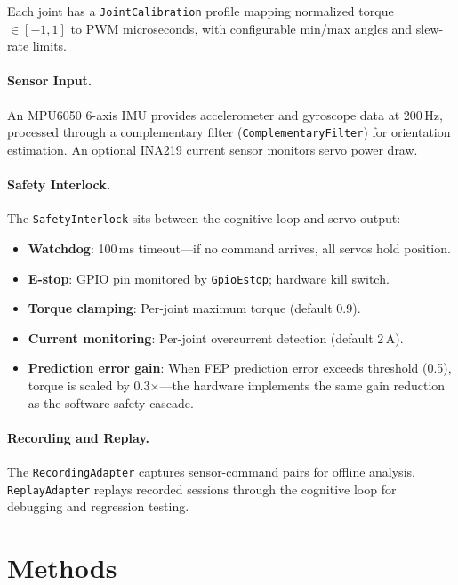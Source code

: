 \documentclass[11pt,twocolumn]{article}
\begin{document}
Each joint has a \texttt{JointCalibration} profile mapping normalized torque $\in [-1, 1]$ to PWM microseconds, with configurable min/max angles and slew-rate limits.

\paragraph{Sensor Input.} An MPU6050 6-axis IMU provides accelerometer and gyroscope data at 200\,Hz, processed through a complementary filter (\texttt{ComplementaryFilter}) for orientation estimation. An optional INA219 current sensor monitors servo power draw.

\paragraph{Safety Interlock.} The \texttt{SafetyInterlock} sits between the cognitive loop and servo output:
\begin{itemize}[nosep]
  \item \textbf{Watchdog}: 100\,ms timeout---if no command arrives, all servos hold position.
  \item \textbf{E-stop}: GPIO pin monitored by \texttt{GpioEstop}; hardware kill switch.
  \item \textbf{Torque clamping}: Per-joint maximum torque (default 0.9).
  \item \textbf{Current monitoring}: Per-joint overcurrent detection (default 2\,A).
  \item \textbf{Prediction error gain}: When FEP prediction error exceeds threshold (0.5), torque is scaled by 0.3$\times$---the hardware implements the same gain reduction as the software safety cascade.
\end{itemize}

\paragraph{Recording and Replay.} The \texttt{RecordingAdapter} captures sensor-command pairs for offline analysis. \texttt{ReplayAdapter} replays recorded sessions through the cognitive loop for debugging and regression testing.

\section{Methods}
\label{sec:methods}
\end{document}
